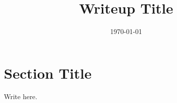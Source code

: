 \documentclass[12pt]{article}
\title{Writeup Title}
\date{\today}
\begin{document}
\maketitle

\section{Section Title}

Write here.



\end{document}
